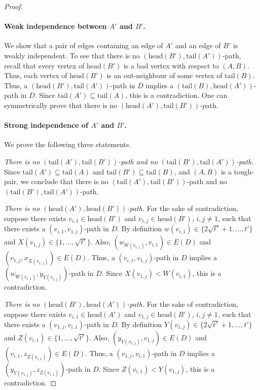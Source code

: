 \documentclass[a4paper,11pt]{article}
\theoremstyle{plain}
\newtheorem{identification rule}{Identification Rule}
\theoremstyle{definition}
\theoremstyle{remark}
\newcommand{\toughpair}{tough-pair}
\newcommand{\head}{\text{head}}
\newcommand{\tail}{\text{tail}}
\begin{document}
\begin{proof}
\paragraph*{Weak independence between $A'$ and $B'$.} We show that a pair of edges containing an edge of $A'$ and an edge of $B'$ is weakly independent.
To see that there is no $(\head(B'),\tail(A'))$-path, 
recall that every vertex of $\head(B')$ is a bad vertex with respect to $(A,B)$.
Thus, each vertex of $\head(B')$ is an out-neighbour of some vertex of $\tail(B)$. Thus, a $(\head(B'),\tail(A'))$-path in $D$ implies a $(\tail(B),\head(A'))$-path in $D$. Since $\tail(A') \subseteq \tail(A)$, this is a contradiction. One can symmetrically prove that there is no
$(\head(A'),\tail(B'))$-path.

\paragraph*{Strong independence of $A'$ and $B'$.} We prove the following three statements.

{\it There is no $(\tail(A'),\tail(B'))$-path and no $(\tail(B'),\tail(A'))$-path.} Since $\tail(A') \subseteq \tail(A)$ and $\tail(B') \subseteq \tail(B)$, and $(A,B)$ is a  \toughpair, we conclude that there is no $(\tail(A'),\allowbreak
\tail(B'))$-path and no $(\tail(B'),\tail(A'))$-path.

{\it There is no $(\head(A'),\head(B'))$-path.} For the sake of contradiction, suppose there exists $v_{i,1} \in \head(B')$ and $v_{1,j} \in \head(B')$, $i,j \neq 1$, such that there exists a $(v_{i,1}, v_{1,j})$-path in $D$. By definition $w(v_{i,1}) \in \{2\sqrt{t'}+1, \ldots, t'\}$ and $X(v_{1,j}) \in \{1, \ldots, \sqrt{t'}\}$. Also, $(w_{W(v_{i,1})}, v_{i,1}) \in E(D)$ and $(v_{1,j}, x_{X(v_{1,j})}) \in E(D)$. Thus, a $(v_{i,1}, v_{1,j})$-path in $D$ implies a $(w_{W(v_{i,1})}, y_{Y(v_{1,j})})$-path in $D$. Since $X(v_{1,j}) < W(v_{i,1})$, this is a contradiction.

{\it There is no $(\head(B'),\head(A'))$-path.} For the sake of contradiction, suppose there exists $v_{i,1} \in \head(A')$ and $v_{1,j} \in \head(B')$, $i,j \neq 1$, such that there exists a $(v_{1,j}, v_{i,1})$-path in $D$. By definition $Y(v_{1,j}) \in \{2\sqrt{t'}+1, \ldots, t'\}$ and $Z(v_{i,1}) \in \{1, \ldots, \sqrt{t'}\}$. Also, $(y_{Y(v_{1,j})}, v_{1,j}) \in E(D)$ and $(v_{i,1}, z_{Z(v_{i,1})}) \in E(D)$. Thus, a $(v_{1,j}, v_{i,1})$-path in $D$ implies a $(y_{Y(v_{1,j})}, z_{Z(v_{i,1})})$-path in $D$. Since $Z(v_{i,1}) < Y(v_{1,j})$, this is a contradiction.


\end{proof}
\end{document}
